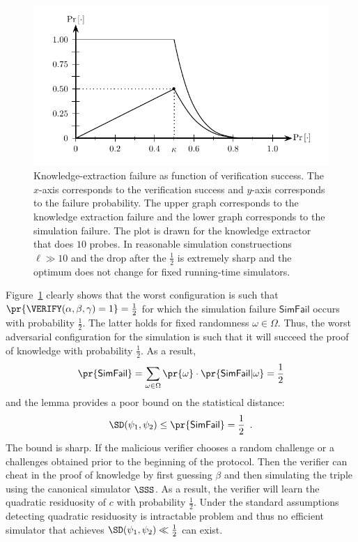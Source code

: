 \documentclass{crypto-exercise}
\newcommand{\SFAIL}{\mathsf{SimFail}}
\begin{document}
\begin{solution}
\begin{figure}[!h]
   \centering
   \includegraphics[scale=0.85]{figures/1102-simulation-failure-i}
   \caption{Knowledge-extraction failure as function of verification success. The $x$-axis corresponds to the verification success and $y$-axis corresponds to the failure probability. The upper graph corresponds to the knowledge extraction failure and the lower graph corresponds to the simulation failure. The plot is drawn for the knowledge extractor that does $10$ probes. In reasonable simulation construections $\ell\gg 10$ and the drop after the $\frac{1}{2}$ is extremely sharp and the optimum does not change for fixed running-time simulators.}
   \label{fig:simulation-failure}
\end{figure}

Figure~\ref{fig:simulation-failure} clearly shows that the worst configuration is such that $\pr{\VERIFY(\alpha,\beta,\gamma)=1}=\frac{1}{2}$ for which the simulation failure $\SFAIL$ occurs with probability $\frac{1}{2}$. The latter holds for fixed randomness $\omega\in\Omega$. Thus, the worst adversarial configuration for the simulation is such that it will succeed the proof of knowledge with probability $\frac{1}{2}$. As a result, 
\begin{align*}
\pr{\SFAIL}=\sum_{\omega\in\Omega}\pr{\omega}\cdot\pr{\SFAIL|\omega}=\frac{1}{2}
\end{align*}  
and the lemma provides a poor bound on the statistical distance:
\begin{align*}
\SD(\psi_1,\psi_2)\leq \pr{\SFAIL}=\frac{1}{2}\enspace.
\end{align*}  
The bound is sharp. If the malicious verifier chooses a random challenge or a challenges obtained prior to the beginning of the protocol. Then the verifier can cheat in the proof of knowledge by first guessing $\beta$ and then simulating the triple using the canonical simulator $\SSS$. As a result, the verifier will learn the quadratic residuosity of $c$ with probability $\frac{1}{2}$. Under the standard assumptions detecting quadratic residuosity is intractable problem and thus no efficient simulator that achieves $\SD(\psi_1,\psi_2)\ll \frac{1}{2}$ can exist.      


\end{solution}
\end{document}
